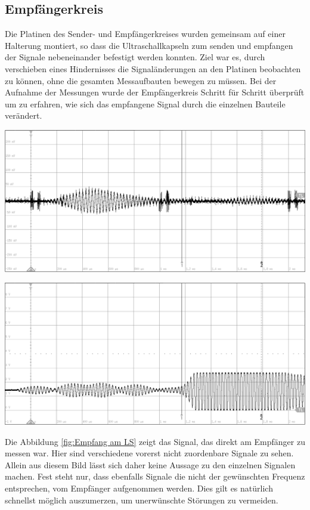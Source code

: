 \subsection{Empfängerkreis}
Die Platinen des Sender- und Empfängerkreises wurden gemeinsam auf einer Halterung montiert, so dass die Ultraschallkapseln zum senden und empfangen der Signale nebeneinander befestigt werden konnten. Ziel war es, durch verschieben eines Hindernisses die Signaländerungen an den Platinen beobachten zu können, ohne die gesamten Messaufbauten bewegen zu müssen. Bei der Aufnahme der Messungen wurde der Empfängerkreis Schritt für Schritt überprüft um zu erfahren, wie sich das empfangene Signal durch die einzelnen Bauteile verändert.\\
\begin{minipage}{0.5\textwidth}
\includegraphics[width=1\textwidth%
]{Abbildungen/MessungenP1/Signal-Empfang.png}
\label{fig:Empfang am LS}
\end{minipage}
\begin{minipage}{0.5\textwidth}
\includegraphics[width=1\textwidth%
]{Abbildungen/MessungenP1/Signal-nach-Verstarkung.png}
\label{fig:Verstaerkung}
\end{minipage}
Die Abbildung \ref{fig:Empfang am LS} zeigt das Signal, das direkt am Empfänger zu messen war. Hier sind verschiedene vorerst nicht zuordenbare Signale zu sehen. Allein aus diesem Bild lässt sich daher keine Aussage zu den einzelnen Signalen machen. Fest steht nur, dass ebenfalls Signale die nicht der gewünschten Frequenz entsprechen, vom Empfänger aufgenommen werden. Dies gilt es natürlich schnellst möglich auszumerzen, um unerwünschte Störungen zu vermeiden.
